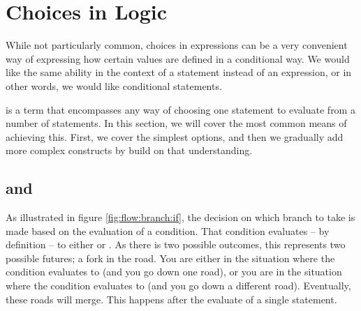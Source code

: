\section{Choices in Logic}
\label{sec:flow:branch}

While not particularly common, choices in expressions can be a very convenient way of expressing how certain values are defined in a conditional way. We would like the same ability in the context of a statement instead of an expression, or in other words, we would like conditional statements.


 is a term that encompasses any way of choosing one statement to evaluate from a number of statements. In this section, we will cover the most common means of achieving this. First, we cover the simplest options, and then we gradually add more complex constructs by build on that understanding.

\subsection{ and }

As illustrated in figure \ref{fig:flow:branch:if}, the decision on which branch to take is made based on the evaluation of a condition. That condition evaluates -- by definition -- to either  or . As there is two possible outcomes, this represents two possible futures; a fork in the road. You are either in the situation where the condition evaluates to  (and you go down one road), or you are in the situation where the condition evaluates to  (and you go down a different road). Eventually, these roads will merge. This happens after the evaluate of a single statement.

